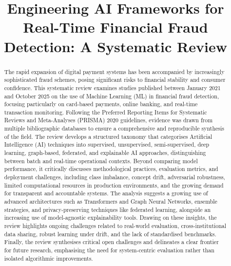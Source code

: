 \documentclass[a4paper,fleqn]{cas-dc}
\begin{document}
\let\WriteBookmarks\relax
\def\floatpagepagefraction{1}
\def\textpagefraction{.001}



\title [mode = title]{Engineering AI Frameworks for Real-Time Financial Fraud Detection: A Systematic Review}  

\begin{abstract}
The rapid expansion of digital payment systems has been accompanied by increasingly sophisticated fraud schemes, posing significant risks to financial stability and consumer confidence. 
This systematic review examines studies published between January 2021 and October 2025 on the use of Machine Learning (ML) in financial fraud detection, focusing particularly on card-based payments, online banking, and real-time transaction monitoring. 
Following the Preferred Reporting Items for Systematic Reviews and Meta-Analyses (PRISMA) 2020 guidelines, evidence was drawn from multiple bibliographic databases to ensure a comprehensive and reproducible synthesis of the field.
The review develops a structured taxonomy that categorises Artificial Intelligence (AI) techniques into supervised, unsupervised, semi-supervised, deep learning, graph-based, federated, and explainable AI approaches, distinguishing between batch and real-time operational contexts. 
Beyond comparing model performance, it critically discusses methodological practices, evaluation metrics, and deployment challenges, including class imbalance, concept drift, adversarial robustness, limited computational resources in production environments, and the growing demand for transparent and accountable systems.
The analysis suggests a growing use of advanced architectures such as Transformers and Graph Neural Networks, ensemble strategies, and privacy-preserving techniques like federated learning, alongside an increasing use of model-agnostic explainability tools. 
Drawing on these insights, the review highlights ongoing challenges related to real-world evaluation, cross-institutional data sharing, robust learning under drift, and the lack of standardised benchmarks.
Finally, the review synthesises critical open challenges and delineates a clear frontier for future research, emphasising the need for system-centric evaluation rather than isolated algorithmic improvements.
\end{abstract}
\end{document}
